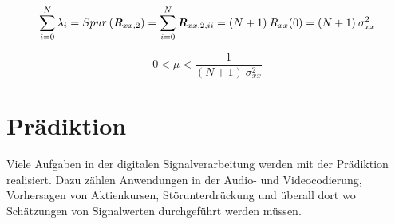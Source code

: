 \documentclass[
    10pt, %
    DIV12,
    english, %
    a5paper, %
    twoside, %
    titlepage, %
    parskip=half, %
    headings=small, %
    listof=totoc, %
    bibliography=totoc, %
    index=totoc, %
    captions=tableheading, %
    final %
]{scrbook}
\begin{document}
\begin{equation}
\sum_{i=0}^{N}\lambda_i=Spur\left(\textit{\textbf{R}}_{xx,2}\right)=\sum_{i=0}^{N}\textit{\textbf{R}}_{xx,2,ii}=(N+1)\:R_{xx}(0)=(N+1)\:\sigma_{xx}^2\nonumber
\end{equation}

\begin{equation}
0 < \mu < \frac{1}{(N+1)\:\sigma_{xx}^2} \nonumber
\end{equation}

\chapter{Prädiktion}
Viele Aufgaben in der digitalen Signalverarbeitung werden mit der Prädiktion realisiert. Dazu zählen Anwendungen in der Audio- und Videocodierung, Vorhersagen von Aktienkursen, 
Störunterdrückung und überall dort wo Schätzungen von Signalwerten durchgeführt werden müssen.
\end{document}
